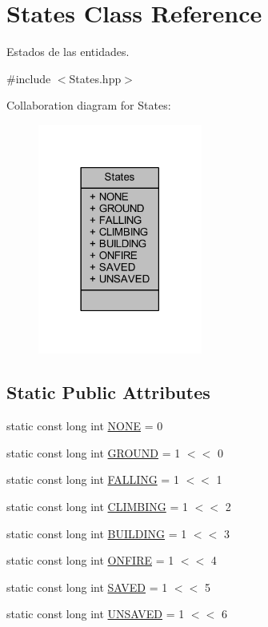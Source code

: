 \hypertarget{class_states}{\section{States Class Reference}
\label{class_states}
}


Estados de las entidades.  




{\ttfamily \#include $<$States.\+hpp$>$}



Collaboration diagram for States\+:
\nopagebreak
\begin{figure}[H]
\begin{center}
\leavevmode
\includegraphics[width=153pt]{dc/d15/class_states__coll__graph}
\end{center}
\end{figure}
\subsection*{Static Public Attributes}
\begin{DoxyCompactItemize}
\item 
static const long int \hyperlink{class_states_a9db2f5d19daaafea1b0b22c8327d1c10}{N\+O\+N\+E} = 0
\item 
static const long int \hyperlink{class_states_a0f5e3ed66f9c135b24d92886a9574dca}{G\+R\+O\+U\+N\+D} = 1 $<$$<$ 0
\item 
static const long int \hyperlink{class_states_ae464e17ebc3214e3c17186d614e37c54}{F\+A\+L\+L\+I\+N\+G} = 1 $<$$<$ 1
\item 
static const long int \hyperlink{class_states_a1a5a36f0f204d9dda0ebd0a09b6fd7fe}{C\+L\+I\+M\+B\+I\+N\+G} = 1 $<$$<$ 2
\item 
static const long int \hyperlink{class_states_a1a05b30c6f6c881b703c40f217890ac2}{B\+U\+I\+L\+D\+I\+N\+G} = 1 $<$$<$ 3
\item 
static const long int \hyperlink{class_states_acd4789eee44fccfaf6ddf2b3d412fb9a}{O\+N\+F\+I\+R\+E} = 1 $<$$<$ 4
\item 
static const long int \hyperlink{class_states_a7ce5eefd815ba486ed485ca3015d9452}{S\+A\+V\+E\+D} = 1 $<$$<$ 5
\item 
static const long int \hyperlink{class_states_ab21454aabe0d13104295c53fec620e73}{U\+N\+S\+A\+V\+E\+D} = 1 $<$$<$ 6
\end{DoxyCompactItemize}


